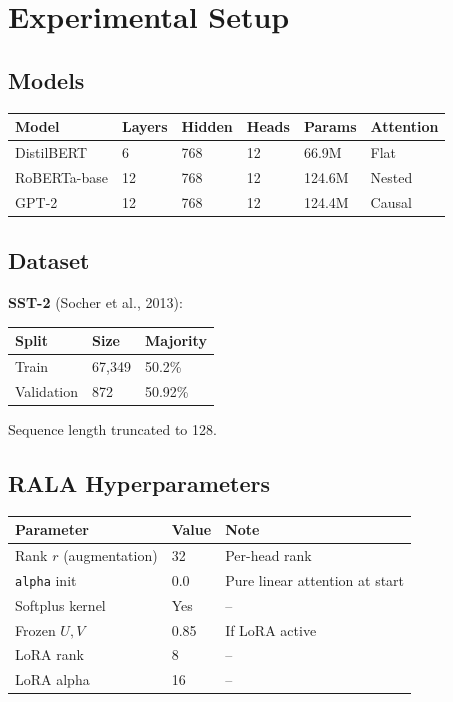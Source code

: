 
\section{Experimental Setup}

\subsection{Models}

\begin{table}[H]
\centering
\small
\begin{tabular}{llllll}
\toprule
\textbf{Model} & \textbf{Layers} & \textbf{Hidden} & \textbf{Heads} & \textbf{Params} & \textbf{Attention} \\
\midrule
DistilBERT & 6 & 768 & 12 & 66.9M & Flat \\
RoBERTa-base & 12 & 768 & 12 & 124.6M & Nested \\
GPT-2 & 12 & 768 & 12 & 124.4M & Causal \\
\bottomrule
\end{tabular}
\end{table}

\subsection{Dataset}

\textbf{SST-2} (Socher et al., 2013):

\begin{table}[H]
\centering
\small
\begin{tabular}{lll}
\toprule
\textbf{Split} & \textbf{Size} & \textbf{Majority} \\
\midrule
Train & 67,349 & 50.2\% \\
Validation & 872 & 50.92\% \\
\bottomrule
\end{tabular}
\end{table}

Sequence length truncated to 128.

\subsection{RALA Hyperparameters}

\begin{table}[H]
\centering
\small
\begin{tabular}{lll}
\toprule
\textbf{Parameter} & \textbf{Value} & \textbf{Note} \\
\midrule
Rank $r$ (augmentation) & 32 & Per-head rank \\
\texttt{alpha} init & 0.0 & Pure linear attention at start \\
Softplus kernel & Yes & -- \\
Frozen $U, V$ & 0.85 & If LoRA active \\
LoRA rank & 8 & -- \\
LoRA alpha & 16 & -- \\
\bottomrule
\end{tabular}
\end{table}

